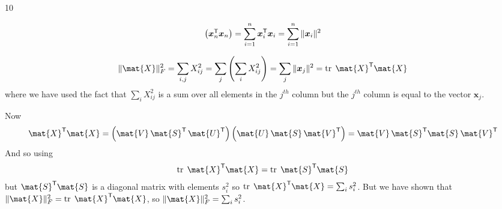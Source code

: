 \documentclass{sotonExamBoxes}    %
\begin{document}
\begin{question}{10}
\begin{qparts}
\begin{answer}
\begin{align*}
\begin{pmatrix}
          \bm{x}_n^{\textsf{T}} \bm{x}_n \\
        \end{pmatrix}
        = \sum_{i=1}^n \bm{x}_i^{\textsf{T}} \bm{x}_i = \sum_{i=1}^n
        \| \bm{x}_i \|^2
      \end{align*}
    \end{answer}
    \freshpage
    \begin{answer}
      \begin{align*}
        \len{\mat{X}}_F^2 = \sum\limits_{i,j} X_{ij}^2 = \sum_j \bra{
        \sum_i X_{ij}^2} = \sum_j \len{\bm{x}_j}^2 = \Tr \mat{X}^\tr \mat{X}
      \end{align*}
      where we have used the fact that  $\sum_i X_{ij}^2$ is a sum
      over all elements in the $j^{th}$ column but the $j^{th}$ column
      is equal to the vector $\bm{x}_j$.
    \end{answer}
    \begin{answer}
      Now
      \begin{align*}
        \mat{X}^\tr \mat{X} = \bra{\mat{V}\,\mat{S}^\tr \,\mat{U}^\tr}
         \bra{\mat{U}\,\mat{S}\,\mat{V}^\tr} = \mat{V}\,\mat{S}^\tr \mat{S}\,\mat{V}^\tr
      \end{align*}
      And so using
      \begin{align*}
        \Tr \mat{X}^\tr \mat{X} = \Tr \mat{S}^\tr \mat{S}
      \end{align*}
      but $\mat{S}^\tr \mat{S}$ is a diagonal matrix with elements
      $s_i^2$ so $\Tr \mat{X}^\tr \mat{X} = \sum_{i} s_i^2$.  But we
      have shown that $\len{\mat{X}}_F^2 = \Tr \mat{X}^\tr \mat{X}$,
      so $\len{\mat{X}}_F^2 = \sum_{i} s_i^2$.
    \end{answer}
  \end{qparts}
\end{question}
\end{document}
